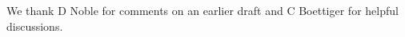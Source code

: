 \documentclass[a4paper,num-refs]{assets/oup-contemporary}
\begin{document}
We thank D Noble for comments on an earlier draft and C Boettiger for helpful discussions. 




\end{document}
